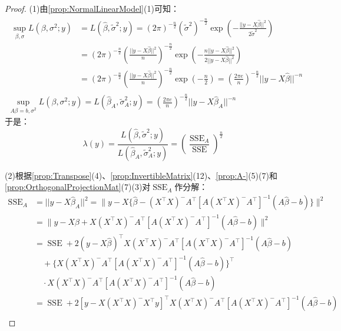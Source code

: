 \begin{proof}
	(1)由\cref{prop:NormalLinearModel}(1)可知：
	\begin{gather*}
		\begin{aligned}
			\sup_{\beta,\sigma}L(\beta,\sigma^2;y)&=L(\hat{\beta},\tilde{\sigma}^2;y)=(2\pi)^{-\frac{n}{2}}(\tilde{\sigma}^2)^{-\frac{n}{2}}\exp\left(-\frac{||y-X\hat{\beta}||^2}{2\tilde{\sigma}^2}\right) \\
			&=(2\pi)^{-\frac{n}{2}}\left(\frac{||y-X\hat{\beta}||^2}{n}\right)^{-\frac{n}{2}}\exp\left(-\frac{n||y-X\hat{\beta}||^2}{2||y-X\hat{\beta}||^2}\right) \\
			&=(2\pi)^{-\frac{n}{2}}\left(\frac{||y-X\hat{\beta}||^2}{n}\right)^{-\frac{n}{2}}\exp\left(-\frac{n}{2}\right)=\left(\frac{2\pi e}{n}\right)^{-\frac{n}{2}}||y-X\hat{\beta}||^{-n}
		\end{aligned} \\
		\sup_{A\beta=b,\sigma^2}L(\beta,\sigma^2;y)=L(\hat{\beta}_A,\tilde{\sigma}_A^2;y)=\left(\frac{2\pi e}{n}\right)^{-\frac{n}{2}}||y-X\hat{\beta}_A||^{-n}
	\end{gather*}
	于是：
	\begin{equation*}
		\lambda(y)=\frac{L(\hat{\beta},\tilde{\sigma}^2;y)}{L(\hat{\beta}_A,\tilde{\sigma}_A^2;y)}=\left(\frac{\operatorname{SSE}_A}{\operatorname{SSE}}\right)^\frac{n}{2}
	\end{equation*}\par
	(2)根据\cref{prop:Transpose}(4)、\cref{prop:InvertibleMatrix}(12)、\cref{prop:A-}(5)(7)和\cref{prop:OrthogonalProjectionMat}(7)(3)对$\operatorname{SSE}_A$作分解：
	\begin{align*}
		\operatorname{SSE}_A&=||y-X\hat{\beta}_A||^2=\Big\|y-X\{\hat{\beta}-(X^{\top}X)^-A^{\top}[A(X^{\top}X)^-A^{\top}]^{-1}(A\hat{\beta}-b)\}\Big\|^2 \\
		&=\Big\|y-X\hat{\beta}+X(X^{\top}X)^-A^{\top}[A(X^{\top}X)^-A^{\top}]^{-1}(A\hat{\beta}-b)\Big\|^2 \\
		&=\operatorname{SSE}+2(y-X\hat{\beta})^{\top}X(X^{\top}X)^-A^{\top}[A(X^{\top}X)^-A^{\top}]^{-1}(A\hat{\beta}-b) \\
		&\quad+\{X(X^{\top}X)^-A^{\top}[A(X^{\top}X)^-A^{\top}]^{-1}(A\hat{\beta}-b)\}^{\top} \\
		&\quad\cdot X(X^{\top}X)^-A^{\top}[A(X^{\top}X)^-A^{\top}]^{-1}(A\hat{\beta}-b) \\
		&=\operatorname{SSE}+2[y-X(X^{\top}X)^-X^{\top}y]^{\top}X(X^{\top}X)^-A^{\top}[A(X^{\top}X)^-A^{\top}]^{-1}(A\hat{\beta}-b) \\

\end{align*}
\end{proof}
